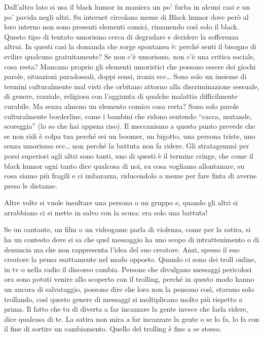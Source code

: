 \documentclass[12pt]{book} %
\begin{document}
\begin{mdframed}[linewidth=1pt]
Dall'altro lato si usa il black humor in maniera un po' furba in alcuni casi e
un po' pavida negli altri. Su internet circolano meme di Black humor dove però al loro interno non
sono presenti elementi comici, rimanendo così solo il black. Questo tipo di tentato umorismo cerca di degradare e
deridere la sofferenza altrui. In questi casi la domanda che sorge spontanea è: perché senti il bisogno di svilire
qualcuno gratuitamente? Se non c'è umorismo, non c'è una critica sociale, cosa resta? Mancano proprio gli elementi
umoristici che possono essere dei giochi parole, situazioni paradossali, doppi sensi, ironia ecc… Sono solo un insieme
di termini culturalmente mal visti che orbitano attorno alla discriminazione sessuale, di genere, razziale, religiosa
con l'aggiunta di qualche malattia difficilmente curabile. Ma senza almeno un elemento comico cosa
resta? Sono solo parole culturalmente borderline, come i bambini che ridono sentendo “cacca, mutande, scoreggia” (lo so
che hai appena riso). Il meccanismo a questo punto prevede che se non ridi è colpa tua perché sei un boomer, un
bigotto, una persona triste, uno senza umorismo ecc… non perché la battuta non fa ridere.
Gli stratagemmi per porsi superiori agli altri sono tanti, uno di questi è il termine cringe, che come il black humor ogni tanto dice qualcosa di noi, su cosa vogliamo allontanare, su cosa siamo più fragili e ci imbarazza, riducendolo a meme per fare finta di averne preso le distanze.

Altre volte si vuole insultare una persona o un gruppo e, quando gli altri si arrabbiano ci si mette in salvo con la
scusa: era solo una battuta!

Se un cantante, un film o un videogame parla di violenza, come per la satira, si ha un contesto dove si sa che quel messaggio ha uno scopo di intrattenimento o di denuncia ma che non rappresenta l'idea del suo creatore. Anzi, spesso il suo creatore la pensa esattamente nel modo opposto. Quando ci sono dei troll online, in tv o nella radio il discorso cambia. Persone che divulgano messaggi pericolosi ora sono potuti venire allo scoperto con il trolling, perché in questo modo hanno un ancora di salvataggio, possono dire che loro non la pensano così, stavano solo trollando, così questo genere di messaggi si moltiplicano molto più rispetto a prima.
Il fatto che tu di diverta a far incazzare la gente invece che farla ridere, dice qualcosa di te.
La satira non mira a far incazzare la gente o se lo fa, lo fa con il fine di sortire un cambiamento. Quello del trolling è fine a se stesso.


\end{mdframed}
\end{document}
